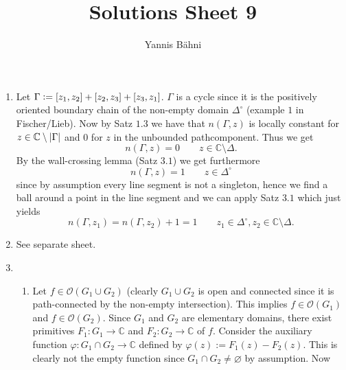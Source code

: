 

\title{Solutions Sheet 9}
\author{Yannis B\"{a}hni}
\address[Yannis B\"{a}hni]{University of Zurich, R\"{a}mistrasse 71, 8006 Zurich}


\maketitle
\thispagestyle{fancy}
\begin{enumerate}[label = \textbf{Exercise \arabic*.},wide = 0pt, itemsep=1.5ex]
	\item Let $\Gamma := \sbr[0]{z_1,z_2} + \sbr[0]{z_2,z_3} + \sbr[0]{z_3,z_1}$. $\Gamma$ is a cycle since it is the positively oriented boundary chain of the non-empty domain $\Delta^\circ$ (example $1$ in Fischer/Lieb). Now by Satz $1.3$ we have that $n(\Gamma,z)$ is locally constant for $z \in \mathbb{C} \setminus \abs[0]{\Gamma}$ and $0$ for $z$ in the unbounded pathcomponent. Thus we get 
	\begin{equation*}
		n(\Gamma,z) = 0 \qquad z \in \mathbb{C} \setminus \Delta.
	\end{equation*}
	By the wall-crossing lemma (Satz $3.1$) we get furthermore 
	\begin{equation*}
		n(\Gamma,z) = 1 \qquad z \in \Delta^\circ
	\end{equation*}
	\noindent since by assumption every line segment is not a singleton, hence we find a ball around a point in the line segment and we can apply Satz $3.1$ which just yields
	\begin{equation*}
		n(\Gamma,z_1) = n(\Gamma,z_2) + 1 = 1 \qquad z_1 \in \Delta^\circ, z_2 \in \mathbb{C} \setminus \Delta.
	\end{equation*}
 	\item See separate sheet.
	\item
	~
	\begin{enumerate}[label = (\roman{*}),wide = 0pt, itemsep=1.5ex]
		\item Let $f \in \mathcal{O}(G_1 \cup G_2)$ (clearly $G_1 \cup G_2$ is open and connected since it is path-connected by the non-empty intersection). This implies $f \in \mathcal{O}(G_1)$ and $f \in \mathcal{O}(G_2)$. Since $G_1$ and $G_2$ are elementary domains, there exist primitives $F_1: G_1 \to \mathbb{C}$ and $F_2: G_2 \to \mathbb{C}$ of $f$. Consider the auxiliary function $\varphi: G_1 \cap G_2 \to \mathbb{C}$ defined by $\varphi(z) := F_1(z) - F_2(z)$. This is clearly not the empty function since $G_1 \cap G_2 \neq \varnothing$ by assumption. Now

\end{enumerate}
\end{enumerate}
